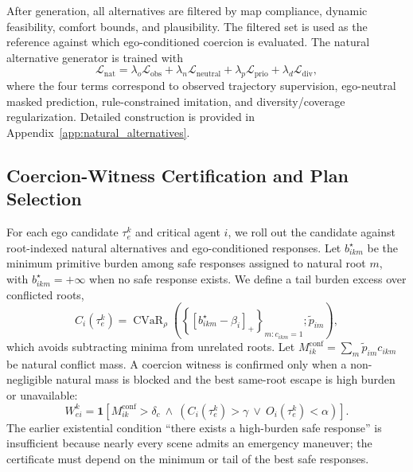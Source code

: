 \documentclass[10pt]{article}
\begin{document}
After generation, all alternatives are filtered by map compliance, dynamic feasibility, comfort bounds, and plausibility. The filtered set is used as the reference against which ego-conditioned coercion is evaluated. The natural alternative generator is trained with
\begin{equation}
    \mathcal{L}_{\mathrm{nat}}
    =
    \lambda_o \mathcal{L}_{\mathrm{obs}}
    +
    \lambda_n \mathcal{L}_{\mathrm{neutral}}
    +
    \lambda_p \mathcal{L}_{\mathrm{prio}}
    +
    \lambda_d \mathcal{L}_{\mathrm{div}} ,
\end{equation}
where the four terms correspond to observed trajectory supervision, ego-neutral masked prediction, rule-constrained imitation, and diversity/coverage regularization. Detailed construction is provided in Appendix~\ref{app:natural_alternatives}.

\subsection{Coercion-Witness Certification and Plan Selection}
\label{sec:method_certification}

For each ego candidate $\tau^k_e$ and critical agent $i$, we roll out the candidate against root-indexed natural alternatives and ego-conditioned responses. Let $b^{\star}_{ikm}$ be the minimum primitive burden among safe responses assigned to natural root $m$, with $b^{\star}_{ikm}=+\infty$ when no safe response exists. We define a tail burden excess over conflicted roots,
\begin{equation}
    C_i(\tau^k_e)
    =\operatorname{CVaR}_{\rho}
    \left(
      \left\{[b^{\star}_{ikm}-\beta_i]_+\right\}_{m:c_{ikm}=1};
      \widetilde p_{im}
    \right),
\end{equation}
which avoids subtracting minima from unrelated roots. Let $M^{\mathrm{conf}}_{ik}=\sum_m\widetilde p_{im}c_{ikm}$ be natural conflict mass. A coercion witness is confirmed only when a non-negligible natural mass is blocked and the best same-root escape is high burden or unavailable:
\begin{equation}
    W^k_{ei}=\mathbf{1}
    \left[
      M^{\mathrm{conf}}_{ik}>\delta_c
      \ \wedge\
      \left(C_i(\tau^k_e)>\gamma\ \vee\ O_i(\tau^k_e)<\alpha\right)
    \right].
    \label{eq:witness}
\end{equation}
The earlier existential condition ``there exists a high-burden safe response'' is insufficient because nearly every scene admits an emergency maneuver; the certificate must depend on the minimum or tail of the best safe responses.
\end{document}

